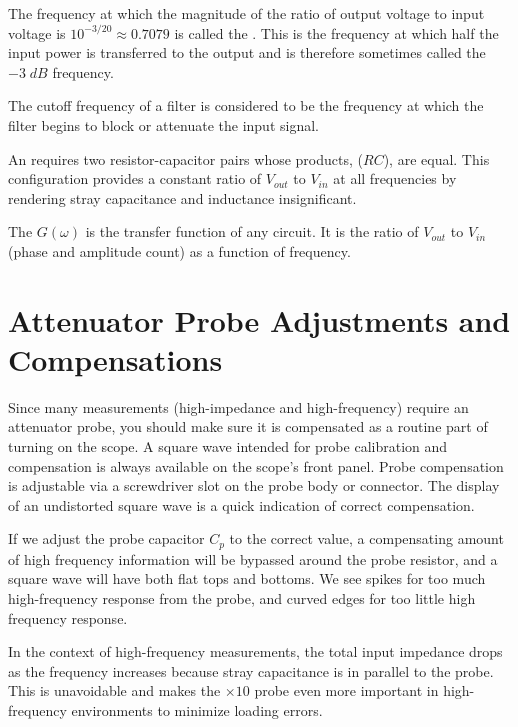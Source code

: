 \begin{defn}
    The frequency at which the magnitude of the ratio of output voltage to input voltage is $10^{-3/20}\approx 0.7079$ is called the . This is the frequency at which half the input power is transferred to the output and is therefore sometimes called the $-3\;dB$ frequency.
\end{defn}

The cutoff frequency of a filter is considered to be the frequency at which the filter begins to block or attenuate the input signal.

\begin{defn}
    An  requires two resistor-capacitor pairs whose products, ($RC$), are equal. This configuration provides a constant ratio of $V_{out}$ to $V_{in}$ at all frequencies by rendering stray capacitance and inductance insignificant.
\end{defn}

\begin{defn}
    The  $G(\omega)$ is the transfer function of any circuit. It is the ratio of $V_{out}$ to $V_{in}$ (phase and amplitude count) as a function of frequency.
\end{defn}

\section{Attenuator Probe Adjustments and Compensations}

Since many measurements (high-impedance and high-frequency) require an attenuator probe, you should make sure it is compensated as a routine part of turning on the scope. A square wave intended for probe calibration and compensation is always available on the scope's front panel. Probe compensation is adjustable via a screwdriver slot on the probe body or connector. The display of an undistorted square wave is a quick indication of correct compensation.

If we adjust the probe capacitor $C_p$ to the correct value, a compensating amount of high frequency information will be bypassed around the probe resistor, and a square wave will have both flat tops and bottoms. We see spikes for too much high-frequency response from the probe, and curved edges for too little high frequency response.

\begin{rmk}
    In the context of high-frequency measurements, the total input impedance drops as the frequency increases because stray capacitance is in parallel to the probe. This is unavoidable and makes the $\times 10$ probe even more important in high-frequency environments to minimize loading errors.
\end{rmk}



